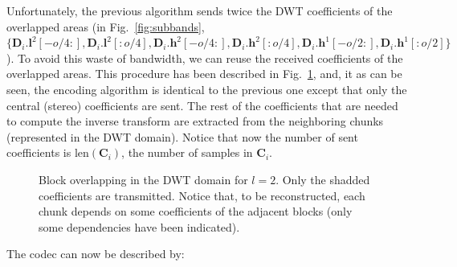 Unfortunately, the previous algorithm sends twice the DWT coefficients
of the overlapped areas (in Fig.~\ref{fig:subbands}, $\{{\mathbf
  D}_i.{\mathbf l}^2[-o/4:], {\mathbf D}_i.{\mathbf l}^2[:o/4],
{\mathbf D}_i.{\mathbf h}^2[-o/4:], {\mathbf D}_i.{\mathbf
  h}^2[:o/4], {\mathbf D}_i.{\mathbf h}^1[-o/2:], {\mathbf
  D}_i.{\mathbf h}^1[:o/2]\}$). To avoid this waste of bandwidth, we
can reuse the received coefficients of the overlapped areas. This
procedure has been described in Fig.~\ref{fig:overlapping}, and,
it as can be seen, the encoding algorithm is identical to the previous
one except that only the central (stereo) coefficients are
sent. The rest of the coefficients that are needed to compute the inverse
transform are extracted from the neighboring chunks (represented in the
DWT domain). Notice that now the number of sent coefficients is
$\text{len}({\mathbf C}_i)$, the number of samples in ${\mathbf C}_i$.

\begin{figure}
  \centering
  \caption{Block overlapping in the DWT domain for $l=2$. Only the
    shadded coefficients are transmitted. Notice that, to be
    reconstructed, each chunk depends on some coefficients of the
    adjacent blocks (only some dependencies have been indicated).}
  \label{fig:overlapping}
\end{figure}


The codec can now be described by:

